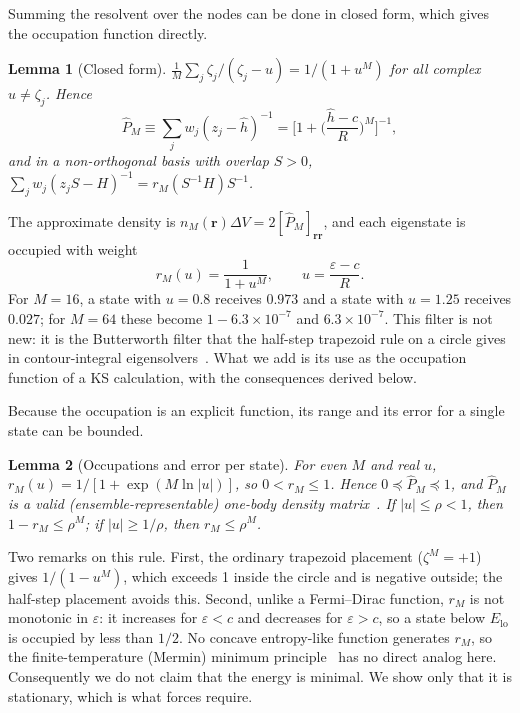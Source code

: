 \documentclass[aps,prb,twocolumn,superscriptaddress,floatfix,longbibliography]{revtex4-2}
\newtheorem{lemma}{Lemma}
\theoremstyle{remark}
\begin{document}
Summing the resolvent over the nodes can be done in closed form, which gives the occupation function directly.

\begin{lemma}[Closed form]\label{lem:closed}
$\frac1M\sum_j\zeta_j/(\zeta_j-u)=1/(1+u^M)$ for all complex $u\neq\zeta_j$. Hence
\begin{equation}
\hat P_M\equiv\sum_{j}w_j(z_j-\hat h)^{-1}=\Big[1+\Big(\frac{\hat h-c}{R}\Big)^M\Big]^{-1},
\label{eq:PM}
\end{equation}
and in a non-orthogonal basis with overlap $S>0$, $\sum_jw_j(z_jS-H)^{-1}=r_M(S^{-1}H)S^{-1}$.
\end{lemma}

The approximate density is $n_M(\bm r)\Delta V=2[\hat P_M]_{\bm r\bm r}$, and each eigenstate is occupied with weight
\begin{equation}
r_M(u)=\frac{1}{1+u^M},\qquad u=\frac{\varepsilon-c}{R}.
\end{equation}
For $M=16$, a state with $u=0.8$ receives $0.973$ and a state with $u=1.25$ receives $0.027$; for $M=64$ these become
$1-6.3\times10^{-7}$ and $6.3\times10^{-7}$. This filter is not new: it is the Butterworth filter that the half-step trapezoid rule on a circle gives in contour-integral
eigensolvers~\cite{Guettel2015,AustinTrefethen2015}. What we add is its use as the occupation function of a KS calculation,
with the consequences derived below.

Because the occupation is an explicit function, its range and its error for a single state can be bounded.

\begin{lemma}[Occupations and error per state]\label{lem:bounds}
For even $M$ and real $u$, $r_M(u)=1/[1+\exp(M\ln|u|)]$, so $0<r_M\le1$. Hence $0\preceq\hat P_M\preceq1$, and $\hat P_M$ is a valid (ensemble-representable) one-body
density matrix~\cite{Coleman1963}. If $|u|\le\rho<1$, then $1-r_M\le\rho^M$; if $|u|\ge1/\rho$, then
$r_M\le\rho^M$.
\end{lemma}

Two remarks on this rule. First, the ordinary trapezoid placement ($\zeta^M=+1$) gives $1/(1-u^M)$, which exceeds 1 inside
the circle and is negative outside; the half-step placement avoids this. Second, unlike a Fermi--Dirac function, $r_M$ is
not monotonic in $\varepsilon$: it increases for $\varepsilon<c$ and decreases for $\varepsilon>c$, so a state below
$E_\mathrm{lo}$ is occupied by less than $1/2$. No concave entropy-like function generates $r_M$, so the finite-temperature
(Mermin) minimum principle~\cite{Mermin1965} has no direct analog here. Consequently we do not claim that the energy is
minimal. We show only that it is stationary, which is what forces require.
\end{document}
